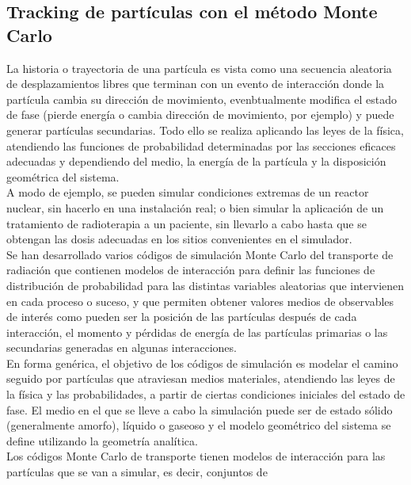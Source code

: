 \subsection{Tracking de part\'iculas con el m\'etodo Monte Carlo}
\label{CapVII_10}

La historia o trayectoria de una part\'icula es vista como una secuencia aleatoria de desplazamientos libres que terminan con un evento 
de interacci\'on donde la part\'icula cambia su direcci\'on de movimiento, evenbtualmente modifica el estado de fase (pierde energ\'ia o 
cambia direcci\'on de movimiento, por ejemplo) y puede generar part\'iculas secundarias. 
%
Todo ello se realiza aplicando las leyes de la f\'isica, atendiendo las funciones de probabilidad determinadas por las secciones eficaces 
adecuadas y dependiendo del medio, la energ\'ia de la part\'icula y la disposici\'on geom\'etrica del sistema. \\
%
%
A modo de ejemplo, se pueden simular condiciones extremas de un reactor nuclear, sin hacerlo en una instalaci\'on real; o bien simular la 
aplicaci\'on de un tratamiento de radioterapia a un paciente, sin llevarlo a cabo hasta que se obtengan las dosis adecuadas en los sitios 
convenientes en el simulador. \\
%
%
Se han desarrollado varios c\'odigos de simulaci\'on Monte Carlo del transporte de radiaci\'on que contienen modelos de interacci\'on para 
definir las funciones de distribuci\'on de probabilidad para las distintas variables aleatorias que intervienen en cada proceso o suceso, 
y que permiten obtener valores medios de observables de inter\'es como pueden ser la posici\'on de las part\'iculas despu\'es de cada 
interacci\'on, el momento y p\'erdidas de energ\'ia de las part\'iculas primarias o las secundarias generadas en algunas interacciones. \\
%
%
En forma gen\'erica, el objetivo de los c\'odigos de simulaci\'on es modelar el camino seguido por part\'iculas que atraviesan medios 
materiales, atendiendo las leyes de la f\'isica y las probabilidades, a partir de ciertas condiciones iniciales del estado de fase.
%
El medio en el que se lleve a cabo la simulaci\'on puede ser de estado s\'olido (generalmente amorfo), l\'iquido o gaseoso y el modelo 
geom\'etrico del sistema se define utilizando la geometr\'ia anal\'itica. \\
%
%
Los c\'odigos Monte Carlo de transporte tienen modelos de interacci\'on para las part\'iculas que se van a simular, es decir, conjuntos de 
